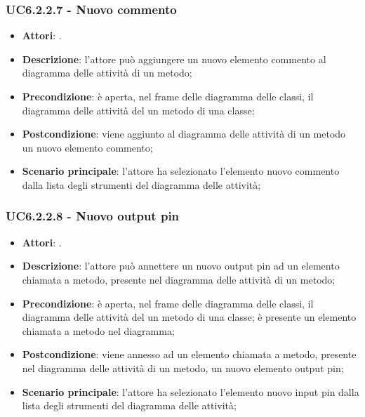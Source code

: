 \subsubsection{UC6.2.2.7 - Nuovo commento} 
\label{sssec:UC6.2.2.7} 
\begin{itemize} 
\item \textbf{Attori}: .
\item \textbf{Descrizione}: l'attore può aggiungere un nuovo elemento commento al diagramma delle attività di un metodo;
\item \textbf{Precondizione}: è aperta, nel frame delle diagramma delle  classi, il diagramma delle attività del un metodo di una classe;
\item \textbf{Postcondizione}: viene aggiunto al diagramma delle attività di un metodo un nuovo elemento commento;
\item \textbf{Scenario principale}: l'attore ha selezionato l'elemento nuovo commento dalla lista degli strumenti del diagramma delle attività;\end{itemize} 
\subsubsection{UC6.2.2.8 - Nuovo output pin} 
\label{sssec:UC6.2.2.8} 
\begin{itemize} 
\item \textbf{Attori}: .
\item \textbf{Descrizione}: l'attore può annettere un nuovo output pin ad un elemento chiamata a metodo, presente nel diagramma delle attività di un metodo;
\item \textbf{Precondizione}: è aperta, nel frame delle diagramma delle  classi, il diagramma delle attività del un metodo di una classe; è presente un elemento chiamata a metodo nel diagramma;
\item \textbf{Postcondizione}: viene annesso ad un elemento chiamata a metodo, presente nel diagramma delle attività di un metodo, un nuovo elemento output pin;
\item \textbf{Scenario principale}: l'attore ha selezionato l'elemento nuovo input pin dalla lista degli strumenti del diagramma delle attività;\end{itemize} 
